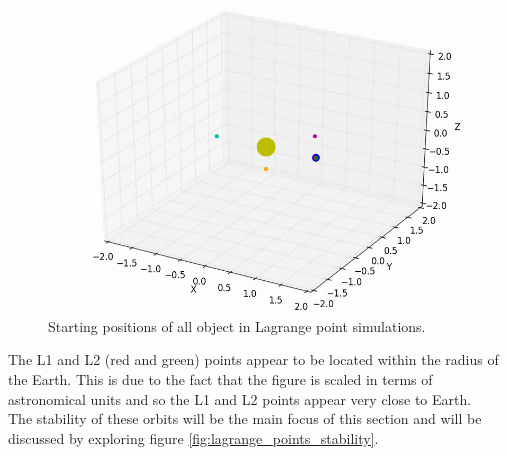 \documentclass[10pt,letterpaper]{article}
\begin{document}
\begin{figure}[!htb]
\centering
\includegraphics[scale=0.35]{figures/lagrange_points/lagrange_points_initialized.png}
\caption{Starting positions of all object in Lagrange point simulations.}\label{fig:lagrange_points_initialized}
\end{figure}

The L1 and L2 (red and green) points appear to be located within the radius of the Earth. This is due to the fact that the figure is scaled in terms of astronomical units and so the L1 and L2 points appear very close to Earth.\\ 

The stability of these orbits will be the main focus of this section and will be discussed by exploring figure \ref{fig:lagrange_points_stability}.
\end{document}
